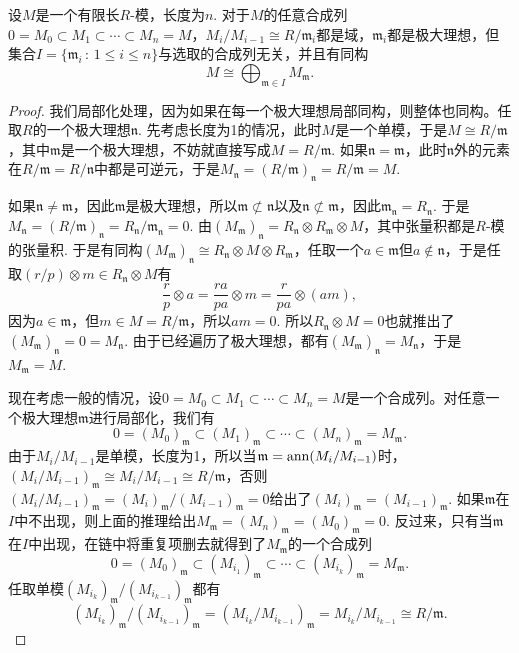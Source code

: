 \begin{thm}\label{finite_length_module}
设$M$是一个有限长$R$-模，长度为$n$. 对于$M$的任意合成列$0=M_0\subset M_1\subset \cdots\subset M_n=M$，$M_i/M_{i-1}\cong R/\mathfrak{m}_i$都是域，$\mathfrak{m}_i$都是极大理想，但集合$I=\{\mathfrak{m}_i\,:\,1\leq i\leq n\}$与选取的合成列无关，并且有同构
\[
	M\cong \bigoplus_{\mathfrak{m}\in I} M_\mathfrak{m}.
\]
\end{thm}

\begin{proof}
	我们局部化处理，因为如果在每一个极大理想局部同构，则整体也同构。任取$R$的一个极大理想$\mathfrak{n}$. 先考虑长度为1的情况，此时$M$是一个单模，于是$M\cong R/\mathfrak{m}$，其中$\mathfrak{m}$是一个极大理想，不妨就直接写成$M=R/\mathfrak{m}$. 如果$\mathfrak{n}=\mathfrak{m}$，此时$\mathfrak{n}$外的元素在$R/\mathfrak{m}=R/\mathfrak{n}$中都是可逆元，于是$M_{\mathfrak{n}}=(R/\mathfrak{m})_{\mathfrak{n}}=R/\mathfrak{m}=M$. 

	如果$\mathfrak{n}\neq \mathfrak{m}$，因此$\mathfrak{m}$是极大理想，所以$\mathfrak{m}\not\subset \mathfrak{n}$以及$\mathfrak{n}\not\subset \mathfrak{m}$，因此$\mathfrak{m}_\mathfrak{n}=R_\mathfrak{n}$. 于是$M_\mathfrak{n}=(R/\mathfrak{m})_\mathfrak{n}=R_\mathfrak{n}/\mathfrak{m}_\mathfrak{n}=0$. 由$(M_\mathfrak{m})_\mathfrak{n}=R_\mathfrak{n}\otimes R_\mathfrak{m} \otimes M$，其中张量积都是$R$-模的张量积. 于是有同构$(M_\mathfrak{m})_\mathfrak{n}\cong R_\mathfrak{n}\otimes M\otimes R_\mathfrak{m}$，任取一个$a\in \mathfrak{m}$但$a\not\in \mathfrak{n}$，于是任取$(r/p)\otimes m \in R_\mathfrak{n}\otimes M$有
	\[
		\frac{r}{p}\otimes a=\frac{ra}{pa}\otimes m =\frac{r}{pa}\otimes (am),
	\]
	因为$a\in \mathfrak{m}$，但$m\in M=R/\mathfrak{m}$，所以$am=0$. 所以$R_\mathfrak{n}\otimes M=0$也就推出了$(M_\mathfrak{m})_\mathfrak{n}=0=M_\mathfrak{n}$. 由于已经遍历了极大理想，都有$(M_\mathfrak{m})_\mathfrak{n}=M_\mathfrak{n}$，于是$M_\mathfrak{m}=M$.

	现在考虑一般的情况，设$0=M_0\subset M_1\subset \cdots\subset M_n=M$是一个合成列。对任意一个极大理想$\mathfrak{m}$进行局部化，我们有
	\[
	0=(M_0)_\mathfrak{m}\subset (M_1)_\mathfrak{m}\subset \cdots\subset (M_n)_\mathfrak{m}=M_\mathfrak{m}.
	\]
	由于$M_i/M_{i-1}$是单模，长度为1，所以当$\mathfrak{m}=\operatorname{ann}(M_i/M_{i-1})$时，$(M_i/M_{i-1})_\mathfrak{m}\cong M_i/M_{i-1}\cong R/\mathfrak{m}$，否则$(M_i/M_{i-1})_{\mathfrak{m}}=(M_i)_{\mathfrak{m}}/(M_{i-1})_{\mathfrak{m}}=0$给出了$(M_i)_{\mathfrak{m}}=(M_{i-1})_{\mathfrak{m}}$. 如果$\mathfrak{m}$在$I$中不出现，则上面的推理给出$M_\mathfrak{m}=(M_n)_\mathfrak{m}=(M_0)_\mathfrak{m}=0$. 反过来，只有当$\mathfrak{m}$在$I$中出现，在链中将重复项删去就得到了$M_\mathfrak{m}$的一个合成列
	\[
	0=(M_0)_\mathfrak{m}\subset (M_{i_1})_\mathfrak{m}\subset \cdots\subset (M_{i_k})_\mathfrak{m}=M_\mathfrak{m}.
	\]
	任取单模$(M_{i_k})_\mathfrak{m}/(M_{i_{k-1}})_\mathfrak{m}$都有
	\[
	(M_{i_k})_\mathfrak{m}/(M_{i_{k-1}})_\mathfrak{m}=(M_{i_k}/M_{i_{k-1}})_\mathfrak{m}=M_{i_k}/M_{i_{k-1}}\cong R/\mathfrak{m}.
	\]


\end{proof}

